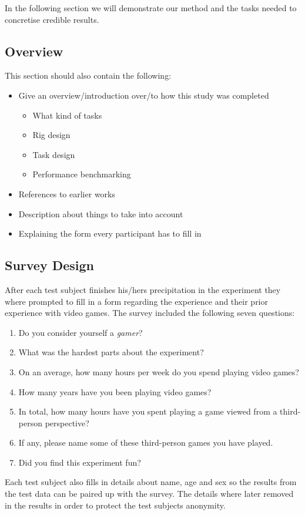 \documentclass[runningheads,a4paper,oribibl]{llncs}
\begin{document}
In the following section we will demonstrate our method and the tasks needed to concretise credible results.

\subsection{Overview}

This section should also contain the following:
\begin{itemize}
	\item Give an overview/introduction over/to how this study was completed
	\begin{itemize}
		\item What kind of tasks
		\item Rig design
		\item Task design
		\item Performance benchmarking
	\end{itemize}
	\item References to earlier works
	\item Description about things to take into account
	\item Explaining the form every participant has to fill in
\end{itemize}







\subsection{Survey Design}
After each test subject finishes his/hers precipitation in the experiment they where prompted to fill in a form regarding the experience and their prior experience with video games. The survey included the following seven questions:
\begin{enumerate}
	\item Do you consider yourself a \emph{gamer}?
	\item What was the hardest parts about the experiment?
	\item On an average, how many hours per week do you spend playing video games?
	\item How many years have you been playing video games?
	\item In total, how many hours have you spent playing a game viewed from a third-person perspective?
	\item If any, please name some of these third-person games you have played.
	\item Did you find this experiment fun?
\end{enumerate}
Each test subject also fills in details about name, age and sex so the results from the test data can be paired up with the survey. The details where later removed in the results in order to protect the test subjects anonymity.
\end{document}
